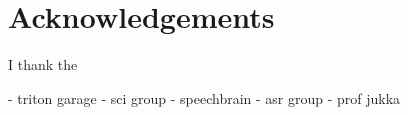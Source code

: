 \chapter*{Acknowledgements}

I thank the 


- triton garage
- sci group
- speechbrain
- asr group
- prof jukka